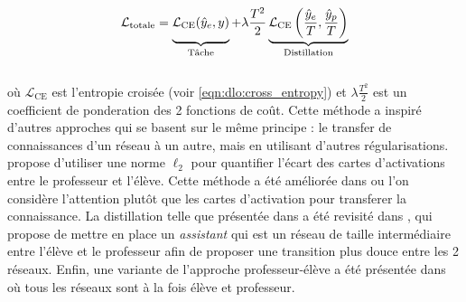 \begin{equation}
  \mathcal{L}_{\text{totale}} = \underbrace{\mathcal{L}_{\text{CE}}(\hat{y}_{e}, y)\vphantom{\left(\frac{\hat{y}_{e}}{T}, \frac{\hat{y}_{p}}{T}\right)}}_{\text{Tâche}} +
  \lambda \frac{T^{2}}{2}\underbrace{\mathcal{L}_{\text{CE}}\left(\frac{\hat{y}_{e}}{T}, \frac{\hat{y}_{p}}{T}\right)}_{\text{Distillation}}
\end{equation}\\

\noindent où $\mathcal{L}_{\text{CE}}$ est l'entropie croisée (voir
\cref{eqn:dlo:cross_entropy}) et $\lambda\frac{T^{2}}{2}$ est un coefficient de
ponderation des 2 fonctions de coût. Cette méthode a inspiré d'autres approches
qui se basent sur le même principe : le transfer de connaissances d'un réseau à
un autre, mais en utilisant d'autres régularisations.
\citeauthor{DBLP:journals/corr/RomeroBKCGB14}
\cite{DBLP:journals/corr/RomeroBKCGB14} propose d'utiliser une norme $\ell_2$
pour quantifier l'écart des cartes d'activations entre le professeur et l'élève.
Cette méthode a été améliorée dans \cite{DBLP:conf/iclr/ZagoruykoK17} ou l'on
considère l'attention plutôt que les cartes d'activation pour transferer la
connaissance. La distillation telle que présentée dans
\cite{DBLP:journals/corr/HintonVD15} a été revisité dans
\cite{DBLP:conf/aaai/MirzadehFLLMG20}, qui propose de mettre en place un
\emph{assistant} qui est un réseau de taille intermédiaire entre l'élève et le
professeur afin de proposer une transition plus douce entre les 2 réseaux.
Enfin, une variante de l'approche professeur-élève a été présentée dans
\cite{DBLP:conf/cvpr/ZhangXHL18} où tous les réseaux sont à la fois élève et
professeur.\\


